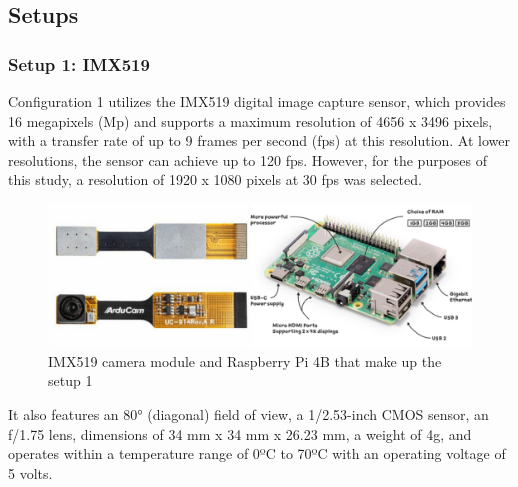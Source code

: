 \documentclass[letterpaper]{article}
\begin{document}




\subsection{Setups}
\subsubsection{Setup 1: IMX519}

Configuration 1 utilizes the IMX519 digital image capture sensor, which provides 16 megapixels (Mp) and supports a maximum resolution of 4656 x 3496 pixels, with a transfer rate of up to 9 frames per second (fps) at this resolution. At lower resolutions, the sensor can achieve up to 120 fps. However, for the purposes of this study, a resolution of 1920 x 1080 pixels at 30 fps was selected. 

\begin{figure}[H]
\centering
\includegraphics[width=0.8\columnwidth]{images/setup_1.png}
\caption{IMX519 camera module and Raspberry Pi 4B that make up the setup 1}
\label{figure:setup_1}
\end{figure}

It also features an 80° (diagonal) field of view, a 1/2.53-inch CMOS sensor, an f/1.75 lens, dimensions of 34 mm x 34 mm x 26.23 mm, a weight of 4g, and operates within a temperature range of 0ºC to 70ºC with an operating voltage of 5 volts.
\end{document}

